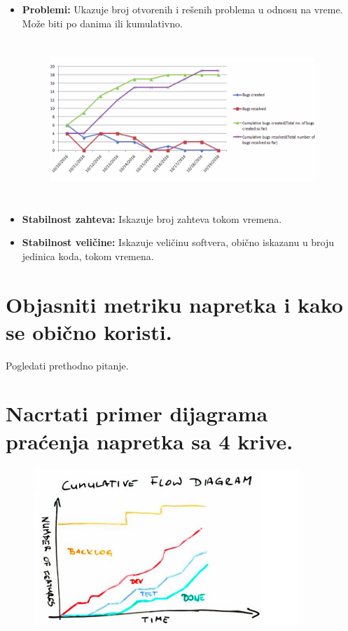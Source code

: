 \documentclass[a4paper]{article}
\begin{document}
\begin{itemize}
\begin{figure}[H]
\begin{center}
      \end{center}
    \end{figure}
    \item \textbf{Problemi:} Ukazuje broj otvorenih i rešenih problema u odnosu na vreme.
          Može biti po danima ili kumulativno.
    \begin{figure}[H]
      \begin{center}
          \includegraphics[width=100mm,height=60mm]{Slike/problemi.png}
      \end{center}
    \end{figure}
    \item \textbf{Stabilnost zahteva:} Iskazuje broj zahteva tokom vremena.
    \item \textbf{Stabilnost veličine:} Iskazuje veličinu softvera, obično iskazanu u 
          broju jedinica koda, tokom vremena.
  \end{itemize}

\section{Objasniti metriku napretka i kako se obično koristi.}
Pogledati prethodno pitanje.

\section{Nacrtati primer dijagrama praćenja napretka sa 4 krive.}
    \begin{figure}[H]
      \begin{center}
          \includegraphics[width=100mm,height=60mm]{Slike/4-krive.jpeg}
      \end{center}
    \end{figure}
  
\end{document}
